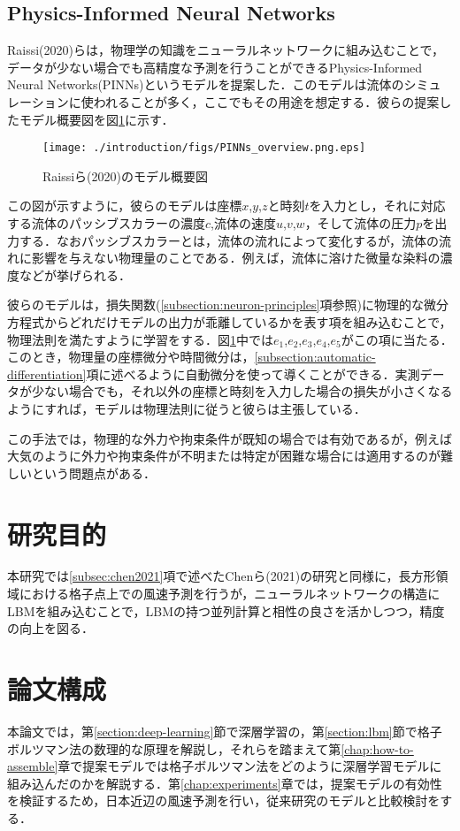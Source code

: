 \subsection{Physics-Informed Neural Networks}
Raissi(2020)らは，物理学の知識をニューラルネットワークに組み込むことで，データが少ない場合でも高精度な予測を行うことができるPhysics-Informed Neural Networks(PINNs)というモデルを提案した\cite{PINNs2020}．このモデルは流体のシミュレーションに使われることが多く\cite{app13126892}，ここでもその用途を想定する．彼らの提案したモデル概要図を図\ref{fig:pinns-overview}に示す．
\begin{figure}[tbp]
    \centering
    \texttt{[image: ./introduction/figs/PINNs\_overview.png.eps]}
    \caption{Raissiら(2020)のモデル概要図\cite{PINNs2020}}
    \label{fig:pinns-overview}
\end{figure}
この図が示すように，彼らのモデルは座標$x$,$y$,$z$と時刻$t$を入力とし，それに対応する流体のパッシブスカラーの濃度$c$,流体の速度$u$,$v$,$w$，そして流体の圧力$p$を出力する．なおパッシブスカラーとは，流体の流れによって変化するが，流体の流れに影響を与えない物理量のことである．例えば，流体に溶けた微量な染料の濃度などが挙げられる\cite{Lesieur1990}．

彼らのモデルは，損失関数(\ref{subsection:neuron-principles}項参照)に物理的な微分方程式からどれだけモデルの出力が乖離しているかを表す項を組み込むことで，物理法則を満たすように学習をする．図\ref{fig:pinns-overview}中では$e_1$,$e_2$,$e_3$,$e_4$,$e_5$がこの項に当たる．このとき，物理量の座標微分や時間微分は，\ref{subsection:automatic-differentiation}項に述べるように自動微分を使って導くことができる．実測データが少ない場合でも，それ以外の座標と時刻を入力した場合の損失が小さくなるようにすれば，モデルは物理法則に従うと彼らは主張している．

この手法では，物理的な外力や拘束条件が既知の場合では有効であるが，例えば大気のように外力や拘束条件が不明または特定が困難な場合には適用するのが難しいという問題点がある．


\section{研究目的}
本研究では\ref{subsec:chen2021}項で述べたChenら(2021)の研究と同様に，長方形領域における格子点上での風速予測を行うが，ニューラルネットワークの構造にLBMを組み込むことで，LBMの持つ並列計算と相性の良さを活かしつつ，精度の向上を図る．

\section{論文構成}
本論文では，第\ref{section:deep-learning}節で深層学習の，第\ref{section:lbm}節で格子ボルツマン法の数理的な原理を解説し，それらを踏まえて第\ref{chap:how-to-assemble}章で提案モデルでは格子ボルツマン法をどのように深層学習モデルに組み込んだのかを解説する．第\ref{chap:experiments}章では，提案モデルの有効性を検証するため，日本近辺の風速予測を行い，従来研究のモデルと比較検討をする．